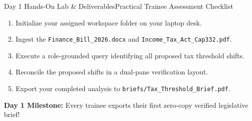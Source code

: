 \documentclass[aspectratio=169, 10pt]{beamer}
\begin{document}
\begin{frame}{Day 1 Hands-On Lab \& Deliverables}{Practical Trainee Assessment Checklist}
  \begin{tcolorbox}[colback=lightgrey, colframe=suagreen, arc=1.5mm, boxrule=0.8pt, title=\textbf{Individual Lab Exercise (90 Minutes)}]
    \small
    \begin{enumerate}
      \item Initialize your assigned workspace folder on your laptop desk.
      \item Ingest the \texttt{Finance\_Bill\_2026.docx} and \texttt{Income\_Tax\_Act\_Cap332.pdf}.
      \item Execute a role-grounded query identifying all proposed tax threshold shifts.
      \item Reconcile the proposed shifts in a dual-pane verification layout.
      \item Export your completed analysis to \texttt{briefs/Tax\_Threshold\_Brief.pdf}.
    \end{enumerate}
  \end{tcolorbox}
  \vspace{4pt}
  \begin{center}
    \textbf{\textcolor{tanzaniablue}{Day 1 Milestone:}} Every trainee exports their first zero-copy verified legislative brief!
  \end{center}
\end{frame}
\end{document}
